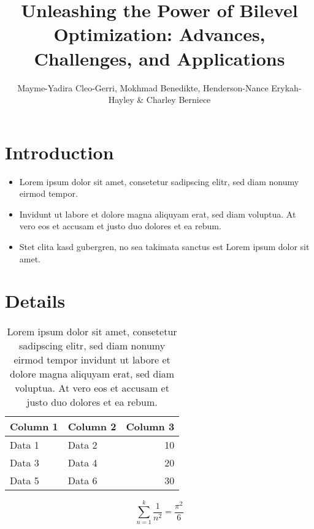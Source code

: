 \documentclass[letter]{bilevelorg}
\title{Unleashing the Power of Bilevel Optimization: Advances, Challenges, and Applications}
\author{Mayme-Yadira Cleo-Gerri,  Mokhmad Benedikte,   Henderson-Nance Erykah-Hayley  \&  Charley Berniece}
\begin{document}
\maketitle

\begin{abstract}
	\lipsum[1]
\end{abstract}

\section{Introduction}

\lipsum[1-3]

\begin{itemize}
  \item Lorem ipsum dolor sit amet, consetetur sadipscing elitr, sed diam nonumy eirmod tempor.
  \item Invidunt ut labore et dolore magna aliquyam erat, sed diam voluptua. At vero eos et accusam et justo duo dolores et ea rebum.
  \item Stet clita kasd gubergren, no sea takimata sanctus est Lorem ipsum dolor sit amet.

\end{itemize}

\lipsum[1-3]

\section{Details}



\begin{table}[!t]
  \centering
  \caption{
Lorem ipsum dolor sit amet, consetetur sadipscing elitr, sed diam nonumy eirmod tempor invidunt ut labore et dolore magna aliquyam erat, sed diam voluptua. At vero eos et accusam et justo duo dolores et ea rebum. 
}
  \label{tab:random}
  \begin{tabular}{llr}
    \toprule
    \textbf{Column 1} & \textbf{Column 2} & \textbf{Column 3} \\
    \midrule
    Data 1 & Data 2 & 10 \\
    Data 3 & Data 4 & 20 \\
    Data 5 & Data 6 & 30 \\
    \bottomrule
  \end{tabular}
\end{table}

\lipsum[1-3]

\[
\sum_{n=1}^{k} \frac{1}{n^2} = \frac{\pi^2}{6}
\]
\end{document}
